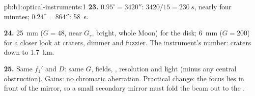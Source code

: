 \begin{solution}{pb:b1:optical-instruments:1}
\textbf{23.} $0.95^\circ = 3420''$: $3420/15 = \qty{230}{s}$, nearly four
minutes; $0.24^\circ = 864''$: \qty{58}{s}.

\textbf{24.} \qty{25}{mm}  ($G = 48$, near $G_r$, bright, whole
Moon) for the disk; \qty{6}{mm} ($G = 200$) for a closer look at craters,
dimmer and fuzzier. The instrument's number: craters down to
\qty{1.7}{km}.

\textbf{25.} Same $f_1'$ and $D$: same $G$, fields, ,
resolution and light (minus any central obstruction). Gains: no
chromatic aberration. Practical change: the focus lies in front of the
mirror, so a small secondary mirror must fold the beam out to the
.
\end{solution}
